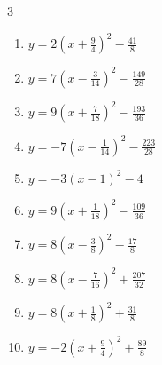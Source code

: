 \begin{multicols}{3}
\begin{enumerate}
  \item $\displaystyle y=2\left( x+\frac{9}{4}\right)^{2}-\frac{41}{8}$


  \item $\displaystyle y=7\left( x-\frac{3}{14}\right)^{2}-\frac{149}{28}$


  \item $\displaystyle y=9\left( x+\frac{7}{18}\right)^{2}-\frac{193}{36}$


  \item $\displaystyle y=-7\left( x-\frac{1}{14}\right)^{2}-\frac{223}{28}$


  \item $\displaystyle y=-3\left( x-1\right)^{2}-4$

        \phantom{$\displaystyle 頂点\left( 1 , -4 \right)$}

\columnbreak %

\resetques

  \item $\displaystyle y=9\left( x+\frac{1}{18}\right)^{2}-\frac{109}{36}$


  \item $\displaystyle y=8\left( x-\frac{3}{8}\right)^{2}-\frac{17}{8}$


  \item $\displaystyle y=8\left( x-\frac{7}{16}\right)^{2}+\frac{207}{32}$


  \item $\displaystyle y=8\left( x+\frac{1}{8}\right)^{2}+\frac{31}{8}$


  \item $\displaystyle y=-2\left( x+\frac{9}{4}\right)^{2}+\frac{89}{8}$


\end{enumerate}
\end{multicols}
